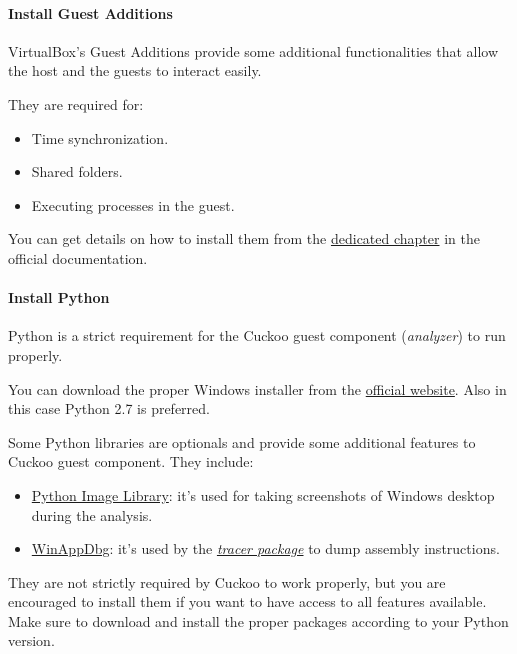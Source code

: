 \documentclass[letterpaper,10pt,english]{sphinxmanual}
\begin{document}
\paragraph{Install Guest Additions}
\label{installation/guest/requirements:install-guest-additions}
VirtualBox's Guest Additions provide some additional functionalities that allow
the host and the guests to interact easily.

They are required for:
\begin{itemize}
\item {} 
Time synchronization.

\item {} 
Shared folders.

\item {} 
Executing processes in the guest.

\end{itemize}

You can get details on how to install them from the \href{http://www.virtualbox.org/manual/ch04.html}{dedicated chapter} in the
official documentation.


\paragraph{Install Python}
\label{installation/guest/requirements:dedicated-chapter}\label{installation/guest/requirements:install-python}
Python is a strict requirement for the Cuckoo guest component (\emph{analyzer}) to
run properly.

You can download the proper Windows installer from the \href{http://www.python.org/getit/}{official website}.
Also in this case Python 2.7 is preferred.

Some Python libraries are optionals and provide some additional features to
Cuckoo guest component. They include:
\begin{itemize}
\item {} 
\href{http://www.pythonware.com/products/pil/}{Python Image Library}: it's used for taking screenshots of Windows desktop during the analysis.

\item {} 
\href{http://winappdbg.sourceforge.net/}{WinAppDbg}: it's used by the {\hyperref[usage/packages::doc]{\emph{tracer package}}} to dump assembly instructions.

\end{itemize}

They are not strictly required by Cuckoo to work properly, but you are encouraged
to install them if you want to have access to all features available. Make sure
to download and install the proper packages according to your Python version.
\end{document}
